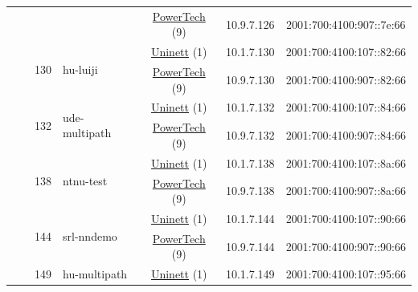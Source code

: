 \begin{small}
\begin{center}
\begin{longtable}{|c|c|c|c|c|c|c|c|}
  &  &  &  & \multicolumn{2}{|c|}{\tiny{\href{http://www.powertech.no}{PowerTech} (9)}} & \tiny{10.9.7.126} & \tiny{2001:700:4100:907::7e:66} \\* \cline{3-3}\cline{4-4}\cline{5-5}\cline{6-6}\cline{7-7}\cline{8-8}
  &  & \multirow{2}{*}{\tiny{130}} & \multicolumn{1}{|l|}{\multirow{2}{*}{\tiny{hu-luiji}}} & \multicolumn{2}{|c|}{\tiny{\href{https://www.uninett.no}{Uninett} (1)}} & \tiny{10.1.7.130} & \tiny{2001:700:4100:107::82:66} \\* \cline{5-5}\cline{6-6}\cline{7-7}\cline{8-8}
  &  &  &  & \multicolumn{2}{|c|}{\tiny{\href{http://www.powertech.no}{PowerTech} (9)}} & \tiny{10.9.7.130} & \tiny{2001:700:4100:907::82:66} \\* \cline{3-3}\cline{4-4}\cline{5-5}\cline{6-6}\cline{7-7}\cline{8-8}
  &  & \multirow{2}{*}{\tiny{132}} & \multicolumn{1}{|l|}{\multirow{2}{*}{\tiny{ude-multipath}}} & \multicolumn{2}{|c|}{\tiny{\href{https://www.uninett.no}{Uninett} (1)}} & \tiny{10.1.7.132} & \tiny{2001:700:4100:107::84:66} \\* \cline{5-5}\cline{6-6}\cline{7-7}\cline{8-8}
  &  &  &  & \multicolumn{2}{|c|}{\tiny{\href{http://www.powertech.no}{PowerTech} (9)}} & \tiny{10.9.7.132} & \tiny{2001:700:4100:907::84:66} \\* \cline{3-3}\cline{4-4}\cline{5-5}\cline{6-6}\cline{7-7}\cline{8-8}
  &  & \multirow{2}{*}{\tiny{138}} & \multicolumn{1}{|l|}{\multirow{2}{*}{\tiny{ntnu-test}}} & \multicolumn{2}{|c|}{\tiny{\href{https://www.uninett.no}{Uninett} (1)}} & \tiny{10.1.7.138} & \tiny{2001:700:4100:107::8a:66} \\* \cline{5-5}\cline{6-6}\cline{7-7}\cline{8-8}
  &  &  &  & \multicolumn{2}{|c|}{\tiny{\href{http://www.powertech.no}{PowerTech} (9)}} & \tiny{10.9.7.138} & \tiny{2001:700:4100:907::8a:66} \\* \cline{3-3}\cline{4-4}\cline{5-5}\cline{6-6}\cline{7-7}\cline{8-8}
  &  & \multirow{2}{*}{\tiny{144}} & \multicolumn{1}{|l|}{\multirow{2}{*}{\tiny{srl-nndemo}}} & \multicolumn{2}{|c|}{\tiny{\href{https://www.uninett.no}{Uninett} (1)}} & \tiny{10.1.7.144} & \tiny{2001:700:4100:107::90:66} \\* \cline{5-5}\cline{6-6}\cline{7-7}\cline{8-8}
  &  &  &  & \multicolumn{2}{|c|}{\tiny{\href{http://www.powertech.no}{PowerTech} (9)}} & \tiny{10.9.7.144} & \tiny{2001:700:4100:907::90:66} \\* \cline{3-3}\cline{4-4}\cline{5-5}\cline{6-6}\cline{7-7}\cline{8-8}
  &  & \multirow{2}{*}{\tiny{149}} & \multicolumn{1}{|l|}{\multirow{2}{*}{\tiny{hu-multipath}}} & \multicolumn{2}{|c|}{\tiny{\href{https://www.uninett.no}{Uninett} (1)}} & \tiny{10.1.7.149} & \tiny{2001:700:4100:107::95:66} \\* \cline{5-5}\cline{6-6}\cline{7-7}\cline{8-8}

\end{longtable}
\end{center}
\end{small}
